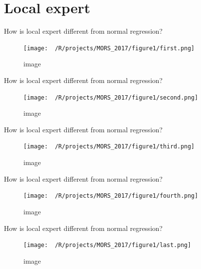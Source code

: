 \documentclass[ignorenonframetext,]{beamer}
\begin{document}
\section{Local expert}\label{local-expert}

\begin{frame}{How is local expert different from normal regression?}

\begin{figure}[htbp]
\centering
\texttt{[image: ~/R/projects/MORS\_2017/figure1/first.png]}
\caption{image}
\end{figure}

\end{frame}

\begin{frame}{How is local expert different from normal regression?}

\begin{figure}[htbp]
\centering
\texttt{[image: ~/R/projects/MORS\_2017/figure1/second.png]}
\caption{image}
\end{figure}

\end{frame}

\begin{frame}{How is local expert different from normal regression?}

\begin{figure}[htbp]
\centering
\texttt{[image: ~/R/projects/MORS\_2017/figure1/third.png]}
\caption{image}
\end{figure}

\end{frame}

\begin{frame}{How is local expert different from normal regression?}

\begin{figure}[htbp]
\centering
\texttt{[image: ~/R/projects/MORS\_2017/figure1/fourth.png]}
\caption{image}
\end{figure}

\end{frame}

\begin{frame}{How is local expert different from normal regression?}

\begin{figure}[htbp]
\centering
\texttt{[image: ~/R/projects/MORS\_2017/figure1/last.png]}
\caption{image}
\end{figure}

\end{frame}
\end{document}
